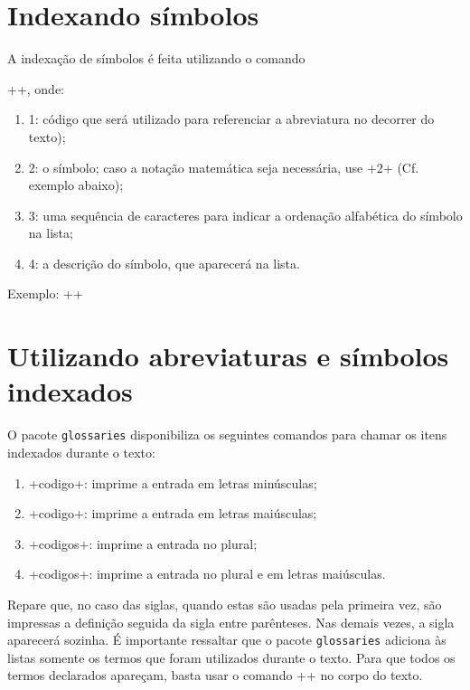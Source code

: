 \documentclass{fei}
\begin{document}
	\section{Indexando símbolos}
	
	A indexação de símbolos é feita utilizando o comando
	
	\latexinline++, onde:
	
	\begin{enumerate}
	\item 1: código que será utilizado para referenciar a abreviatura no decorrer do texto);
	\item 2: o símbolo; caso a notação matemática seja necessária, use \latexinline+\ensuremath{2}+ (Cf. exemplo abaixo);
	\item 3: uma sequência de caracteres para indicar a ordenação alfabética do símbolo na lista;
	\item 4: a descrição do símbolo, que aparecerá na lista.
	\end{enumerate}
	
	Exemplo: \latexinline++

	\section{Utilizando abreviaturas e símbolos indexados}
	
	O pacote \texttt{glossaries} disponibiliza os seguintes comandos para chamar os itens indexados durante o texto:
	
	\begin{enumerate}
	\item \latexinline+\gls{codigo}+: imprime a entrada em letras minúsculas;
	\item \latexinline+\Gls{codigo}+: imprime a entrada em letras maiúsculas;
	\item \latexinline+\glspl{codigo}+: imprime a entrada no plural;
	\item \latexinline+\Glspl{codigo}+: imprime a entrada no plural e em letras maiúsculas.
	\end{enumerate}
	
	Repare que, no caso das siglas, quando estas são usadas pela primeira vez, são impressas a definição seguida da sigla entre parênteses. Nas demais vezes, a sigla aparecerá sozinha. É importante ressaltar que o pacote \texttt{glossaries} adiciona às listas somente os termos que foram utilizados durante o texto. Para que todos os termos declarados apareçam, basta usar o comando \latexinline+\glsaddall+ no corpo do texto.
	
\end{document}
